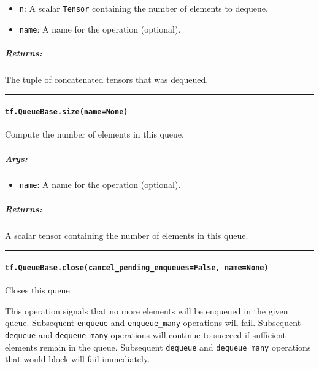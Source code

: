 \begin{itemize}
\tightlist
\item
  \texttt{n}: A scalar \texttt{Tensor} containing the number of elements
  to dequeue.
\item
  \texttt{name}: A name for the operation (optional).
\end{itemize}

\subparagraph{Returns: }\label{returns-44}

The tuple of concatenated tensors that was dequeued.

\begin{center}\rule{0.5\linewidth}{\linethickness}\end{center}

\paragraph{\texorpdfstring{\texttt{tf.QueueBase.size(name=None)}
}{tf.QueueBase.size(name=None) }}\label{tf.queuebase.sizenamenone}

Compute the number of elements in this queue.

\subparagraph{Args: }\label{args-51}

\begin{itemize}
\tightlist
\item
  \texttt{name}: A name for the operation (optional).
\end{itemize}

\subparagraph{Returns: }\label{returns-45}

A scalar tensor containing the number of elements in this queue.

\begin{center}\rule{0.5\linewidth}{\linethickness}\end{center}

\paragraph{\texorpdfstring{\texttt{tf.QueueBase.close(cancel\_pending\_enqueues=False,\ name=None)}
}{tf.QueueBase.close(cancel\_pending\_enqueues=False, name=None) }}\label{tf.queuebase.closecancelux5fpendingux5fenqueuesfalse-namenone}

Closes this queue.

This operation signals that no more elements will be enqueued in the
given queue. Subsequent \texttt{enqueue} and \texttt{enqueue\_many}
operations will fail. Subsequent \texttt{dequeue} and
\texttt{dequeue\_many} operations will continue to succeed if sufficient
elements remain in the queue. Subsequent \texttt{dequeue} and
\texttt{dequeue\_many} operations that would block will fail
immediately.

